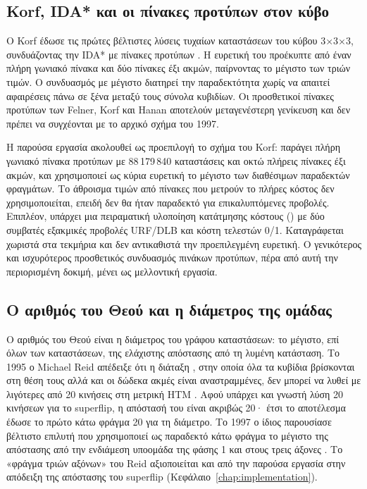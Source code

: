\subsection{Korf, IDA* και οι πίνακες προτύπων στον κύβο}
\label{sec:background-korf}

Ο Korf έδωσε τις πρώτες βέλτιστες λύσεις τυχαίων καταστάσεων του κύβου 3×3×3, συνδυάζοντας την IDA* με πίνακες προτύπων \cite{korf1997pattern}. Η ευρετική του προέκυπτε από έναν πλήρη γωνιακό πίνακα και δύο πίνακες έξι ακμών, παίρνοντας το μέγιστο των τριών τιμών. Ο συνδυασμός με μέγιστο διατηρεί την παραδεκτότητα χωρίς να απαιτεί αφαιρέσεις πάνω σε ξένα μεταξύ τους σύνολα κυβιδίων. Οι προσθετικοί πίνακες προτύπων των Felner, Korf και Hanan αποτελούν μεταγενέστερη γενίκευση \cite{felner2004additivePDB} και δεν πρέπει να συγχέονται με το αρχικό σχήμα του 1997.

Η παρούσα εργασία ακολουθεί ως προεπιλογή το σχήμα του Korf: παράγει πλήρη γωνιακό πίνακα προτύπων με 88\,179\,840 καταστάσεις και οκτώ πλήρεις πίνακες έξι ακμών, και χρησιμοποιεί ως κύρια ευρετική το μέγιστο των διαθέσιμων παραδεκτών φραγμάτων. Το άθροισμα τιμών από πίνακες που μετρούν το πλήρες κόστος δεν χρησιμοποιείται, επειδή δεν θα ήταν παραδεκτό για επικαλυπτόμενες προβολές. Επιπλέον, υπάρχει μια πειραματική υλοποίηση κατάτμησης κόστους () με δύο συμβατές εξακμικές προβολές URF/DLB και κόστη τελεστών 0/1. Καταγράφεται χωριστά στα τεκμήρια και δεν αντικαθιστά την προεπιλεγμένη ευρετική. Ο γενικότερος και ισχυρότερος προσθετικός συνδυασμός πινάκων προτύπων, πέρα από αυτή την περιορισμένη δοκιμή, μένει ως μελλοντική εργασία.

\subsection{Ο αριθμός του Θεού και η διάμετρος της ομάδας}
\label{sec:background-godsnumber}

Ο αριθμός του Θεού είναι η διάμετρος του γράφου καταστάσεων: το μέγιστο, επί όλων των καταστάσεων, της ελάχιστης απόστασης από τη λυμένη κατάσταση. Το 1995 ο Michael Reid απέδειξε ότι η διάταξη , στην οποία όλα τα κυβίδια βρίσκονται στη θέση τους αλλά και οι δώδεκα ακμές είναι αναστραμμένες, δεν μπορεί να λυθεί με λιγότερες από 20 κινήσεις στη μετρική HTM \cite{reid1995superflip}. Αφού υπάρχει και γνωστή λύση 20 κινήσεων για το superflip, η απόστασή του είναι ακριβώς 20· έτσι το αποτέλεσμα έδωσε το πρώτο κάτω φράγμα 20 για τη διάμετρο. Το 1997 ο ίδιος παρουσίασε βέλτιστο επιλυτή που χρησιμοποιεί ως παραδεκτό κάτω φράγμα το μέγιστο της απόστασης από την ενδιάμεση υποομάδα της φάσης 1 και στους τρεις άξονες \cite{reid1997optimal}. Το «φράγμα τριών αξόνων» του Reid αξιοποιείται και από την παρούσα εργασία στην απόδειξη της απόστασης του superflip (Κεφάλαιο~\ref{chap:implementation}).

